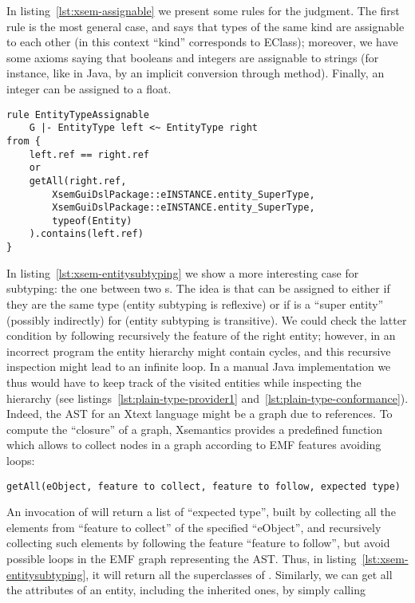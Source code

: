 In listing~\ref{lst:xsem-assignable} we present some rules for the
 judgment.  The first rule is the most general case, and says
that types of the same kind are assignable to each other (in this context
``kind'' corresponds to EClass); moreover, we have some axioms saying that
booleans and integers are assignable to strings (for instance, like in Java, by
an implicit conversion through  method).  Finally, an integer can
be assigned to a float.

\begin{lstlisting}[language=xsemantics,float,label=lst:xsem-entitysubtyping,caption=Rule
for \mytt{isAssignable} for entity types.] 
rule EntityTypeAssignable
	G |- EntityType left <~ EntityType right
from {
	left.ref == right.ref
	or
	getAll(right.ref, 
		XsemGuiDslPackage::eINSTANCE.entity_SuperType,
		XsemGuiDslPackage::eINSTANCE.entity_SuperType,
		typeof(Entity)
	).contains(left.ref)
}
\end{lstlisting}

In listing~\ref{lst:xsem-entitysubtyping} we show a more interesting case for
subtyping: the one between two s.  The idea is that
 can be assigned to  either if they are the same type (entity
subtyping is reflexive) or if  is a ``super entity'' (possibly
indirectly) for  (entity subtyping is transitive).  We could check
the latter condition by following recursively the feature  of
the right entity; however, in an incorrect program the entity hierarchy might 
contain cycles, and this recursive inspection might lead to an infinite loop. 
In a manual Java implementation we thus would have to keep track of the visited
entities while inspecting the hierarchy (see
listings~\ref{lst:plain-type-provider1} and~\ref{lst:plain-type-conformance}). 
Indeed, the AST for an Xtext language might be a graph due to references. 
To compute the ``closure'' of a graph, Xsemantics provides a predefined function
which allows to collect nodes in a graph according to EMF features avoiding
loops:

\begin{small}
\begin{verbatim}
getAll(eObject, feature to collect, feature to follow, expected type)
\end{verbatim}
\end{small}

\noindent An invocation of  will return a list of ``expected
type'', built by collecting all the elements from ``feature to collect'' of the
specified ``eObject'', and recursively collecting such elements by following the
feature ``feature to follow'', but avoid possible loops in the EMF graph
representing the AST.
Thus, in listing~\ref{lst:xsem-entitysubtyping}, it will return all
the superclasses of .  Similarly, we can get all the attributes of
an entity, including the inherited ones, by simply calling

